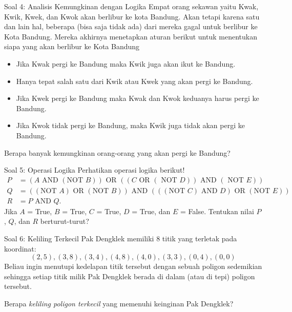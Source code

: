 \documentclass[english,t]{beamer}
\begin{document}
\begin{frame}{Soal 4: Analisis Kemungkinan dengan Logika}
Empat orang sekawan yaitu Kwak, Kwik, Kwek, dan Kwok akan berlibur ke kota Bandung. Akan tetapi karena satu dan lain hal, beberapa (bisa saja tidak ada) dari mereka gagal untuk berlibur ke Kota Bandung. Mereka akhirnya menetapkan aturan berikut untuk menentukan siapa yang akan berlibur ke Kota Bandung

\begin{itemize}
	\item Jika Kwak pergi ke Bandung maka Kwik juga akan ikut ke Bandung.
	\item Hanya tepat salah satu dari Kwik atau Kwek yang akan pergi ke Bandung.
	\item Jika Kwek pergi ke Bandung maka Kwak dan Kwok keduanya harus pergi ke Bandung.
	\item Jika Kwok tidak pergi ke Bandung, maka Kwik juga tidak akan pergi ke Bandung.
\end{itemize}

Berapa banyak kemungkinan orang-orang yang akan pergi ke Bandung?
\end{frame}

\begin{frame}{Soal 5: Operasi Logika}
Perhatikan operasi logika berikut!
\begin{align*}
P &= (A \text{ AND }(\text{NOT }B)) \text{ OR }((C \text{ OR }(\text{ NOT }D)) \text{ AND } (\text{ NOT }E)) \\
Q &= ((\text{NOT }A) \text{ OR }(\text{NOT }B)) \text{ AND }(((\text{NOT }C) \text{ AND }D) \text{ OR }(\text{NOT } E))  \\
R &= P \text{ AND }Q.
\end{align*}
Jika $A$ = True, $B$ = True, $C$ = True, $D$ = True, dan $E$ = False. Tentukan nilai $P$, $Q$, dan $R$ berturut-turut?
\end{frame}


\begin{frame}{Soal 6: Keliling Terkecil}
Pak Dengklek memiliki 8 titik yang terletak pada koordinat:
\begin{equation*}
(2,5), (3,8), (3,4), (4,8), (4,0), (3,3), (0,4), (0,0)
\end{equation*}
Beliau ingin menutupi kedelapan titik tersebut dengan sebuah poligon sedemikian sehingga setiap titik milik Pak Dengklek berada di dalam (atau di tepi) poligon tersebut. 

\bigskip
Berapa \textit{keliling poligon terkecil} yang memenuhi keinginan Pak Dengklek?
\end{frame}
\end{document}
